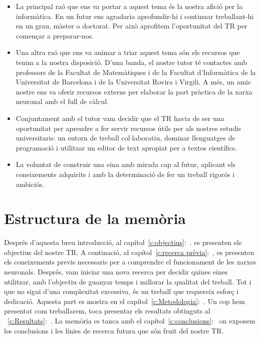 \begin{itemize}
\item La principal raó que ens va portar a aquest tema és la nostra afició per la informàtica. En un futur ens agradaria aprofundir-hi i continuar treballant-hi en un grau, màster o doctorat. Per això aprofitem l’oportunitat del TR per començar a preparar-nos.

\item Una altra raó que ens va animar a triar aquest tema són els recursos que tenim a la nostra disposició. D'una banda, el nostre tutor té contactes amb professors de la Facultat de Matemàtiques i de la Facultat d’Informàtica de la Universitat de Barcelona i de la Universitat Rovira i Virgili. A més, un amic nostre ens va oferir recursos externs per elaborar la part pràctica de la xarxa neuronal amb el full de càlcul.

\item Conjuntament amb el tutor vam decidir que el TR havia de ser una oportunitat per aprendre a fer servir recursos útils per als nostres estudis universitaris: un entorn de treball col$\cdot$laboratiu, dominar llenguatges de programació i utilitzar un editor de text apropiat per a textos científics.

\item La voluntat de construir una eina amb mirada cap al futur, aplicant els coneixements adquirits i amb la determinació de fer un treball rigorós i ambiciós.
\end{itemize}

\section{Estructura de la memòria}

Després d'aquesta breu introducció, al capítol~\ref{c:objectius}:~. es presenten els objectius del nostre TR. A continació, al capítol~\ref{c:recerca prèvia}:~, es presenten els coneixements previs necessaris per a comprendre el funcionament de les xarxes neuronals.
Després, vam iniciar una nova recerca per decidir quines eines utilitzar, amb l’objectiu de guanyar temps i millorar la qualitat del treball. Tot i que no sigui d’una complexitat excessiva, és un treball que requereix esforç i dedicació. Aquesta part es mostra en el capítol~\ref{c:Metodologia}:~. Un cop hem presentat com treballarem, toca presentar els resultats obtinguts al ~\ref{c:Resultats}:~.
La memòria es tanca amb el capítol~\ref{c:conclusions}:~ on exposem les conclusions i les línies de recerca futura que són fruit del nostre TR.



